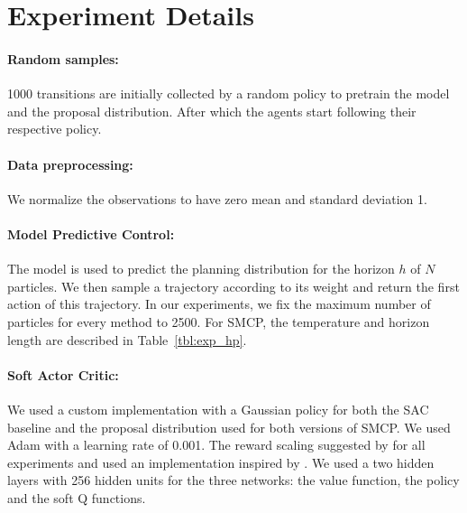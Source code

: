 
\section{Experiment Details}
\label{app:exp_details}

\paragraph{Random samples:} 1000 transitions are initially collected by a random policy to pretrain the model and the proposal distribution. After which the agents start following their respective policy.

\paragraph{Data preprocessing:} We normalize the observations to have zero mean and standard deviation 1. 

\paragraph{Model Predictive Control:} The model is used to predict the planning distribution for the horizon $h$ of $N$ particles. We then sample a trajectory according to its weight and return the first action of this trajectory. In our experiments, we fix the maximum number of particles for every method to 2500. For SMCP, the temperature and horizon length are described in Table~\ref{tbl:exp_hp}.

\paragraph{Soft Actor Critic:} We used a custom implementation with a Gaussian policy for both the SAC baseline and the proposal distribution used for both versions of SMCP. We used Adam \citep{kingma2014adam} with a learning rate of 0.001. The reward scaling suggested by \citet{haarnoja2018soft} for all experiments and used an implementation inspired by \citet{pong2018}. We used a two hidden layers with 256 hidden units for the three networks: the value function, the policy and the soft Q functions.

